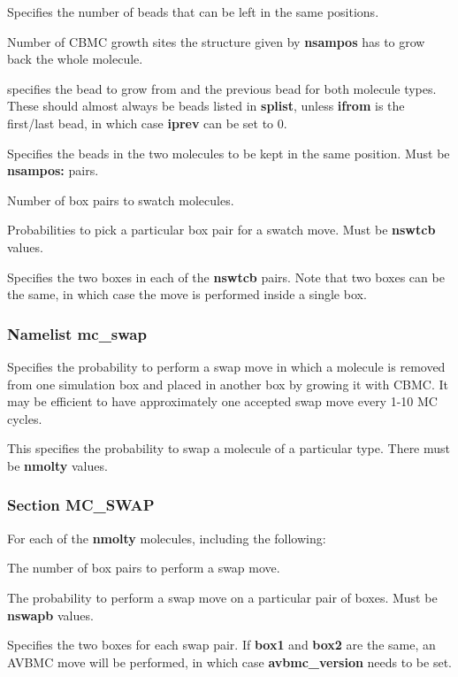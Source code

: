 \documentclass[12pt,letterpaper]{article}
\begin{document}
 Specifies the number of beads that
can be left in the same positions.

 Number of CBMC growth sites the
structure given by {\bf nsampos} has to grow back the whole
molecule.

 specifies the bead
to grow from and the previous bead for both molecule types.
These should almost always be beads listed in {\bf splist},
unless {\bf ifrom} is the first/last bead, in which case
{\bf iprev} can be set to 0.

 Specifies the beads in the two
molecules to be kept in the same position. Must be {\bf
  nsampos:} pairs.

 Number of box pairs to swatch molecules.

 Probabilities to pick a particular
box pair for a swatch move. Must be {\bf nswtcb} values.

 Specifies the two boxes in each
of the {\bf nswtcb} pairs. Note that two boxes can be the
same, in which case the move is performed inside a single
box.

\subsubsection{Namelist \textbf{mc\_swap}}
 Specifies the probability to perform
a swap move in which a molecule is removed from one
simulation box and placed in another box by growing it with
CBMC. It may be efficient to have approximately one accepted
swap move every 1-10 MC cycles.

 This specifies the probability to
swap a molecule of a particular type. There must be {\bf
  nmolty} values.

\subsubsection{Section \textbf{MC\_SWAP}}
For each of the \textbf{nmolty} molecules, including the following:

 The number of box pairs to perform a
swap move.

 The probability to perform a swap
move on a particular pair of boxes. Must be {\bf nswapb}
values.

 Specifies the two boxes for each
swap pair. If {\bf box1} and {\bf box2} are the same, an
AVBMC move will be performed, in which case
\textbf{avbmc\_version} needs to be set.
\end{document}
